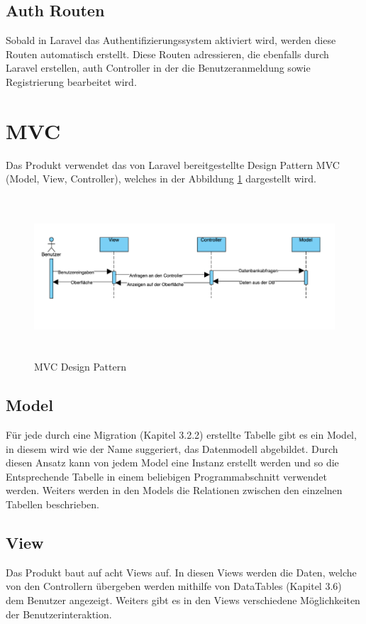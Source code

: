 \subsection{Auth Routen}
Sobald in Laravel das Authentifizierungssystem aktiviert wird, werden diese Routen automatisch erstellt. Diese Routen adressieren, die ebenfalls durch Laravel erstellen, auth Controller in der die Benutzeranmeldung sowie Registrierung bearbeitet wird.


\section{MVC}\label{sec: MVC}
Das Produkt verwendet das von Laravel bereitgestellte Design Pattern MVC (Model, View, Controller), welches in der Abbildung \ref{fig:MVC} dargestellt wird. 

\begin{figure}[h]
	\centering
	\includegraphics[height=6cm,width=18cm]{images/MVC}
	\caption{MVC Design Pattern}
	\label{fig:MVC}
\end{figure}

\subsection{Model}
Für jede durch eine Migration (Kapitel 3.2.2) erstellte Tabelle gibt es ein Model, in diesem wird wie der Name suggeriert, das Datenmodell abgebildet. Durch diesen Ansatz kann von jedem Model eine Instanz erstellt werden und so die Entsprechende Tabelle in einem beliebigen Programmabschnitt verwendet werden. Weiters werden in den Models die Relationen zwischen den einzelnen Tabellen beschrieben.
\subsection{View}
Das Produkt baut auf acht Views auf. In diesen Views werden die Daten, welche von den Controllern übergeben werden mithilfe von DataTables (Kapitel 3.6) dem Benutzer angezeigt. Weiters gibt es in den Views verschiedene Möglichkeiten der Benutzerinteraktion.
